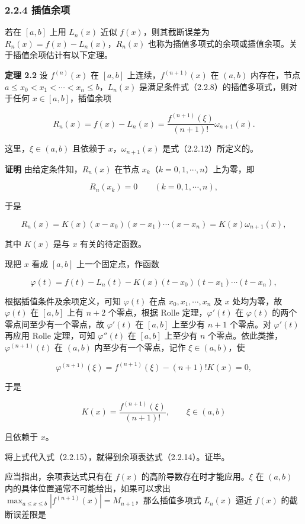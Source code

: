 \documentclass[
  10pt,
  fontset=fandol]{ctexart}
\begin{document}
\subsubsection{2.2.4 插值余项}\label{ux63d2ux503cux4f59ux9879}

若在 \([a,b]\) 上用 \(L_n(x)\) 近似 \(f(x)\)，则其截断误差为 \(R_n(x)=f(x)-L_n(x)\)，\(R_n(x)\) 也称为插值多项式的余项或插值余项。关于插值余项估计有以下定理。

\textbf{定理 2.2} 设 \(f^{(n)}(x)\) 在 \([a,b]\) 上连续，\(f^{(n+1)}(x)\) 在 \((a,b)\) 内存在，节点 \(a\le x_0<x_1<\cdots<x_n\le b\)，\(L_n(x)\) 是满足条件式（2.2.8）的插值多项式，则对于任何 \(x\in[a,b]\)，插值余项

\[
R_n(x)=f(x)-L_n(x)=\frac{f^{(n+1)}(\xi)}{(n+1)!}\omega_{n+1}(x).
\tag{2.2.14}
\]

这里，\(\xi\in(a,b)\) 且依赖于 \(x\)，\(\omega_{n+1}(x)\) 是式（2.2.12）所定义的。

\textbf{证明} 由给定条件知，\(R_n(x)\) 在节点 \(x_k\)（\(k=0,1,\cdots,n\)）上为零，即

\[
R_n(x_k)=0\qquad(k=0,1,\cdots,n),
\]

于是

\[
R_n(x)=K(x)(x-x_0)(x-x_1)\cdots(x-x_n)=K(x)\omega_{n+1}(x),
\tag{2.2.15}
\]

其中 \(K(x)\) 是与 \(x\) 有关的待定函数。

现把 \(x\) 看成 \([a,b]\) 上一个固定点，作函数

\[
\varphi(t)=f(t)-L_n(t)-K(x)(t-x_0)(t-x_1)\cdots(t-x_n),
\]

根据插值条件及余项定义，可知 \(\varphi(t)\) 在点 \(x_0,x_1,\cdots,x_n\) 及 \(x\) 处均为零，故 \(\varphi(t)\) 在 \([a,b]\) 上有 \(n+2\) 个零点，根据 Rolle 定理，\(\varphi'(t)\) 在 \(\varphi(t)\) 的两个零点间至少有一个零点，故 \(\varphi'(t)\) 在 \([a,b]\) 上至少有 \(n+1\) 个零点。对 \(\varphi'(t)\) 再应用 Rolle 定理，可知 \(\varphi''(t)\) 在 \([a,b]\) 上至少有 \(n\) 个零点。依此类推，\(\varphi^{(n+1)}(t)\) 在 \((a,b)\) 内至少有一个零点，记作 \(\xi\in(a,b)\)，使

\[
\varphi^{(n+1)}(\xi)=f^{(n+1)}(\xi)-(n+1)!K(x)=0,
\]

于是

\[
K(x)=\frac{f^{(n+1)}(\xi)}{(n+1)!},\qquad \xi\in(a,b)
\]

且依赖于 \(x\)。

将上式代入式（2.2.15），就得到余项表达式（2.2.14）。证毕。

应当指出，余项表达式只有在 \(f(x)\) 的高阶导数存在时才能应用。\(\xi\) 在 \((a,b)\) 内的具体位置通常不可能给出，如果可以求出 \(\max_{a\le x\le b}|f^{(n+1)}(x)|=M_{n+1}\)，那么插值多项式 \(L_n(x)\) 逼近 \(f(x)\) 的截断误差限是
\end{document}
